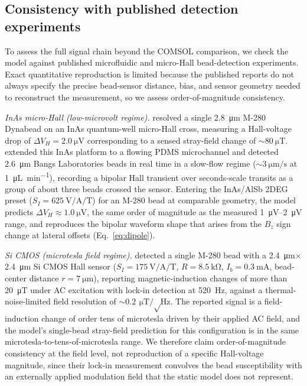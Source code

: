 \documentclass[pdflatex,sn-basic]{sn-jnl}
\theoremstyle{thmstyleone}
\theoremstyle{thmstyletwo}
\theoremstyle{thmstylethree}
\begin{document}
\subsection{Consistency with published detection experiments}\label{sec:expvalidation}

To assess the full signal chain beyond the COMSOL comparison, we check the model against published microfluidic and micro-Hall bead-detection experiments. Exact quantitative reproduction is limited because the published reports do not always specify the precise bead-sensor distance, bias, and sensor geometry needed to reconstruct the measurement, so we assess order-of-magnitude consistency.

\textit{InAs micro-Hall (low-microvolt regime).} \citet{mihajlovic2005} resolved a single \SI{2.8}{\micro\meter} M-280 Dynabead on an InAs quantum-well micro-Hall cross, measuring a Hall-voltage drop of $\Delta V_H = \SI{2.0}{\micro\volt}$ corresponding to a sensed stray-field change of ${\sim}\SI{80}{\micro\tesla}$. \citet{aledealat2009} extended this InAs platform to a flowing PDMS microchannel and detected \SI{2.6}{\micro\meter} Bangs Laboratories beads in real time in a slow-flow regime (${\sim}\SI{3}{\micro\meter\per\second}$ at \SI{1}{\micro\liter\per\minute}), recording a bipolar Hall transient over seconds-scale transits as a group of about three beads crossed the sensor. Entering the InAs/AlSb 2DEG preset ($S_I = \SI{625}{\volt\per\ampere\per\tesla}$) for an M-280 bead at comparable geometry, the model predicts $\Delta V_H \approx \SI{1.0}{\micro\volt}$, the same order of magnitude as the measured \SIrange{1}{2}{\micro\volt} range, and reproduces the bipolar waveform shape that arises from the $B_z$ sign change at lateral offsets (Eq.~\eqref{eq:dipole}).

\textit{Si CMOS (microtesla field regime).} \citet{besse2002} detected a single M-280 bead with a \SI{2.4}{\micro\meter}$\times$\SI{2.4}{\micro\meter} Si CMOS Hall sensor ($S_I = \SI{175}{\volt\per\ampere\per\tesla}$, $R = \SI{8.5}{\kilo\ohm}$, $I_b = \SI{0.3}{\milli\ampere}$, bead-center distance $r = \SI{7}{\micro\meter}$), reporting magnetic-induction changes of more than \SI{20}{\micro\tesla} under AC excitation with lock-in detection at \SI{520}{\hertz}, against a thermal-noise-limited field resolution of ${\sim}\SI{0.2}{\micro\tesla\per\sqrt\hertz}$. The reported signal is a field-induction change of order tens of microtesla driven by their applied AC field, and the model's single-bead stray-field prediction for this configuration is in the same microtesla-to-tens-of-microtesla range. We therefore claim order-of-magnitude consistency at the field level, not reproduction of a specific Hall-voltage magnitude, since their lock-in measurement convolves the bead susceptibility with an externally applied modulation field that the static model does not represent.
\end{document}
